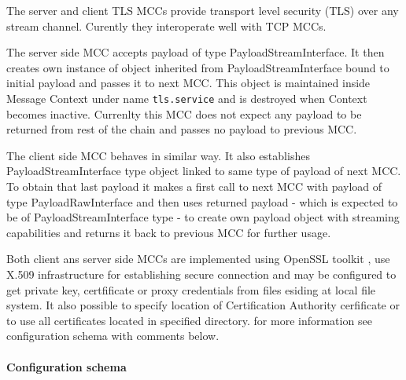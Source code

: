 \documentclass{book}
\begin{document}

The server and client TLS MCCs provide transport level security (TLS) over any stream channel. Curently they interoperate well with TCP MCCs.

The server side MCC accepts payload of type PayloadStreamInterface. It then creates own instance of object inherited from PayloadStreamInterface bound to initial payload and passes it to next MCC. This object is maintained inside Message Context under name \texttt{tls.service} and is destroyed when Context becomes inactive. Currenlty this MCC does not expect any payload to be returned from rest of the chain and passes no payload to previous MCC.

The client side MCC behaves in similar way. It also establishes PayloadStreamInterface type object linked to same type of payload of next MCC. To obtain that last payload it makes a first call to next MCC with payload of type PayloadRawInterface and then uses returned payload - which is expected to be of PayloadStreamInterface type - to create own payload object with streaming capabilities and returns it back to previous MCC for further usage.

Both client ans server side MCCs are implemented using OpenSSL toolkit \cite{openssl}, use X.509 infrastructure \cite{x509} for establishing secure connection and may be configured to get private key, certfificate or proxy credentials from files esiding at local file system. It also possible to specify location of Certification Authority cerfificate or to use all certificates located in specified directory. for more information see configuration schema with comments below.


\paragraph{Configuration schema}
\end{document}
